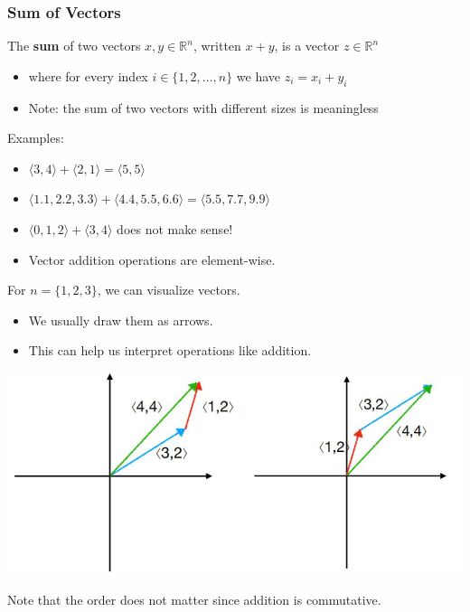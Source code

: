 \documentclass[10pt]{article}
\begin{document}
\subsubsection*{Sum of Vectors}
The \textbf{sum} of two vectors $x, y \in \mathbb{R}^n$, written $x + y$, is a vector $z \in \mathbb{R}^n$
\begin{itemize}
	\item where for every index $i \in \{1, 2, \dots, n\}$ we have $z_i = x_i + y_i$
	\item Note: the sum of two vectors with different sizes is meaningless
\end{itemize}
Examples:
\begin{itemize}
	\item $\langle 3, 4\rangle + \langle 2, 1 \rangle = \langle 5, 5 \rangle$
	\item $\langle 1.1, 2.2, 3.3 \rangle + \langle 4.4, 5.5, 6.6 \rangle = \langle 5.5, 7.7, 9.9 \rangle$
	\item $\langle 0, 1, 2 \rangle + \langle 3, 4 \rangle$ does not make sense!
	\item Vector addition operations are element-wise.
\end{itemize}
For $n = \{1, 2, 3\}$, we can visualize vectors.
\begin{itemize}
	\item We usually draw them as arrows.
	\item This can help us interpret operations like addition.
\end{itemize}
\begin{center} 
	\includegraphics*[width=\textwidth]{M5_1.png} 
\end{center}
Note that the order does not matter since addition is commutative.
\end{document}
